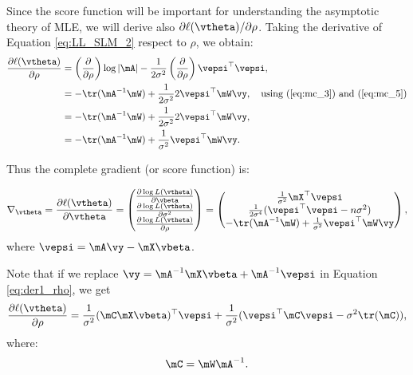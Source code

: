Since the score function will be important for understanding the asymptotic theory of MLE, we will derive also $\partial \ell(\vtheta) / \partial \rho$. Taking the derivative of Equation \eqref{eq:LL_SLM_2} respect to $\rho$, we obtain:
\begin{equation}\label{eq:der1_rho}
  \begin{aligned}
      \frac{\partial \ell(\vtheta)}{\partial \rho} & =  \left(\frac{\partial}{\partial \rho}\right)\log \left| \mA\right| -  \frac{1}{2\sigma^2}\left(\frac{\partial}{\partial \rho}\right)\vepsi^\top \vepsi, \\
      & = - \tr(\mA^{-1}\mW) +\frac{1}{2\sigma^2}2\vepsi^\top\mW\vy,\quad\mbox{using (\ref{eq:mc_3}) and (\ref{eq:mc_5})} \\
      & = - \tr(\mA^{-1}\mW) +\frac{1}{2\sigma^2}2\vepsi^\top\mW\vy, \\
      & = - \tr(\mA^{-1}\mW) +\frac{1}{\sigma^2}\vepsi^\top\mW\vy. 
  \end{aligned}
\end{equation}

Thus the complete gradient (or score function) is:

\begin{equation}\label{eq:full_agradient}
  \nabla_{\vtheta} = \frac{\partial \ell(\vtheta)}{\partial \vtheta} = 
    \begin{pmatrix}
    \frac{\partial \log L(\vtheta)}{\partial \vbeta} \\
    \frac{\partial \log L(\vtheta)}{\partial \sigma^2} \\
    \frac{\partial \log L(\vtheta)}{\partial \rho}
    \end{pmatrix}
    =
    \begin{pmatrix}
    \frac{1}{\sigma^2}\mX^\top\vepsi \\
    \frac{1}{2\sigma^4}(\vepsi^\top\vepsi-n\sigma^2) \\
    - \tr(\mA^{-1}\mW) +\frac{1}{\sigma^2}\vepsi^\top\mW\vy
    \end{pmatrix},
\end{equation}
%
where $\vepsi = \mA\vy - \mX\vbeta$.

Note that if we replace $\vy = \mA^{-1}\mX\vbeta + \mA^{-1}\vepsi$ in Equation \eqref{eq:der1_rho}, we get
\begin{equation*}
 \frac{\partial \ell(\vtheta)}{\partial \rho} = \frac{1}{\sigma^2}(\mC\mX\vbeta)^\top \vepsi + \frac{1}{\sigma^2}(\vepsi^\top\mC\vepsi - \sigma^2 \tr(\mC)),
\end{equation*}
%
where:
\begin{equation}\label{eq:Cmatrix}
  \mC = \mW\mA^{-1}.
\end{equation}

